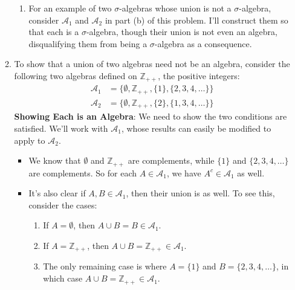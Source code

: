 \documentclass[12pt]{article}
\theoremstyle{plain}
\theoremstyle{definition}
\theoremstyle{remark}
\begin{document}
\begin{enumerate}
\begin{enumerate}
\begin{enumerate}
\item For an example of two $\sigma$-algebras whose union is not a $\sigma$-algebra, consider $\mathscr{A}_1$ and $\mathscr{A}_2$ in part (b) of this problem. I'll construct them so that each is a $\sigma$-algebra, though their union is not even an algebra, disqualifying them from being a $\sigma$-algebra as a consequence.

\end{enumerate}

\item
    To show that a union of two algebras need not be an algebra, consider the following two algebras defined on $\mathbb{Z}_{++}$, the positive integers:
\begin{align*}
\mathscr{A}_1 
    &=\{\emptyset, \mathbb{Z}_{++}, \{1\}, \{2, 3, 4, \ldots\}\}\\
\mathscr{A}_2 
    &=\{\emptyset, \mathbb{Z}_{++}, \{2\}, \{1, 3, 4, \ldots\}\} 
\end{align*}
\textbf{Showing Each is an Algebra}: We need to show the two conditions are satisfied. We'll work with $\mathscr{A}_1$, whose results can easily be modified to apply to $\mathscr{A}_2$.
\begin{itemize}
    \item We know that $\emptyset$ and $\mathbb{Z}_{++}$ are complements, while $\{1\}$ and $\{2, 3, 4, \ldots\}$ are complements. So for each $A\in\mathscr{A}_1$, we have $A^c\in\mathscr{A}_1$ as well.

    \item It's also clear if $A, B\in\mathscr{A}_1$, then their union is as well. To see this, consider the cases:
        \begin{enumerate}
            \item If $A=\emptyset$, then $A\cup B = B\in\mathscr{A}_1$. 
            \item If $A=\mathbb{Z}_{++}$, then $A\cup B = \mathbb{Z}_{++}\in\mathscr{A}_1$.
            \item The only remaining case is where $A=\{1\}$ and $B=\{2,3,4,\ldots\}$, in which case $A\cup B = \mathbb{Z}_{++}\in\mathscr{A}_1$.
        \end{enumerate}
\end{itemize}


\end{enumerate}
\end{enumerate}
\end{document}
